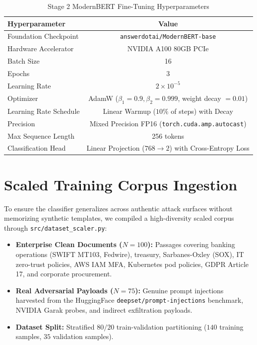 \begin{table}[htbp]
\centering
\caption{Stage 2 ModernBERT Fine-Tuning Hyperparameters}
\label{tab:hyperparams}
\begin{tabular}{|l|c|}
\hline
\textbf{Hyperparameter} & \textbf{Value} \\
\hline
Foundation Checkpoint & \texttt{answerdotai/ModernBERT-base} \\
\hline
Hardware Accelerator & NVIDIA A100 80GB PCIe \\
\hline
Batch Size & 16 \\
\hline
Epochs & 3 \\
\hline
Learning Rate & $2 \times 10^{-5}$ \\
\hline
Optimizer & AdamW ($\beta_1=0.9, \beta_2=0.999$, weight decay $= 0.01$) \\
\hline
Learning Rate Schedule & Linear Warmup ($10\%$ of steps) with Decay \\
\hline
Precision & Mixed Precision FP16 (\texttt{torch.cuda.amp.autocast}) \\
\hline
Max Sequence Length & 256 tokens \\
\hline
Classification Head & Linear Projection ($768 \to 2$) with Cross-Entropy Loss \\
\hline
\end{tabular}
\end{table}

\section{Scaled Training Corpus Ingestion}
To ensure the classifier generalizes across authentic attack surfaces without memorizing synthetic templates, we compiled a high-diversity scaled corpus through \texttt{src/dataset_scaler.py}:
\begin{itemize}
    \item \textbf{Enterprise Clean Documents ($N=100$):} Passages covering banking operations (SWIFT MT103, Fedwire), treasury, Sarbanes-Oxley (SOX), IT zero-trust policies, AWS IAM MFA, Kubernetes pod policies, GDPR Article 17, and corporate procurement.
    \item \textbf{Real Adversarial Payloads ($N=75$):} Genuine prompt injections harvested from the HuggingFace \texttt{deepset/prompt-injections} benchmark, NVIDIA Garak probes, and indirect exfiltration payloads.
    \item \textbf{Dataset Split:} Stratified $80/20$ train-validation partitioning ($140$ training samples, $35$ validation samples).
\end{itemize}

